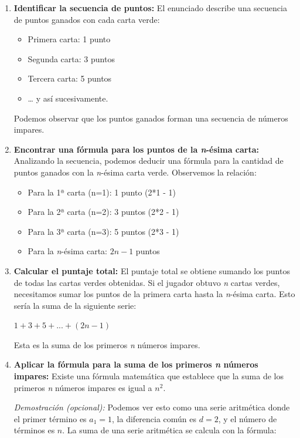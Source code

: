 \documentclass[
]{article}
\providecommand{\tightlist}{%
  \setlength{\itemsep}{0pt}\setlength{\parskip}{0pt}}
\begin{document}
\begin{enumerate}
\def\labelenumi{\arabic{enumi}.}
\item
  \textbf{Identificar la secuencia de puntos:} El enunciado describe una
  secuencia de puntos ganados con cada carta verde:

  \begin{itemize}
  \tightlist
  \item
    Primera carta: 1 punto
  \item
    Segunda carta: 3 puntos
  \item
    Tercera carta: 5 puntos
  \item
    \ldots{} y así sucesivamente.
  \end{itemize}

  Podemos observar que los puntos ganados forman una secuencia de
  números impares.
\item
  \textbf{Encontrar una fórmula para los puntos de la \emph{n}-ésima
  carta:} Analizando la secuencia, podemos deducir una fórmula para la
  cantidad de puntos ganados con la \emph{n}-ésima carta verde.
  Observemos la relación:

  \begin{itemize}
  \tightlist
  \item
    Para la 1ª carta (n=1): 1 punto (2*1 - 1)
  \item
    Para la 2ª carta (n=2): 3 puntos (2*2 - 1)
  \item
    Para la 3ª carta (n=3): 5 puntos (2*3 - 1)
  \item
    Para la \emph{n}-ésima carta: \(2n - 1\) puntos
  \end{itemize}
\item
  \textbf{Calcular el puntaje total:} El puntaje total se obtiene
  sumando los puntos de todas las cartas verdes obtenidas. Si el jugador
  obtuvo \emph{n} cartas verdes, necesitamos sumar los puntos de la
  primera carta hasta la \emph{n}-ésima carta. Esto sería la suma de la
  siguiente serie:

  \(1 + 3 + 5 + ... + (2n - 1)\)

  Esta es la suma de los primeros \emph{n} números impares.
\item
  \textbf{Aplicar la fórmula para la suma de los primeros \emph{n}
  números impares:} Existe una fórmula matemática que establece que la
  suma de los primeros \emph{n} números impares es igual a \(n^2\).

  \emph{Demostración (opcional):} Podemos ver esto como una serie
  aritmética donde el primer término es \(a_1 = 1\), la diferencia común
  es \(d = 2\), y el número de términos es \(n\). La suma de una serie
  aritmética se calcula con la fórmula:


\end{enumerate}
\end{document}
